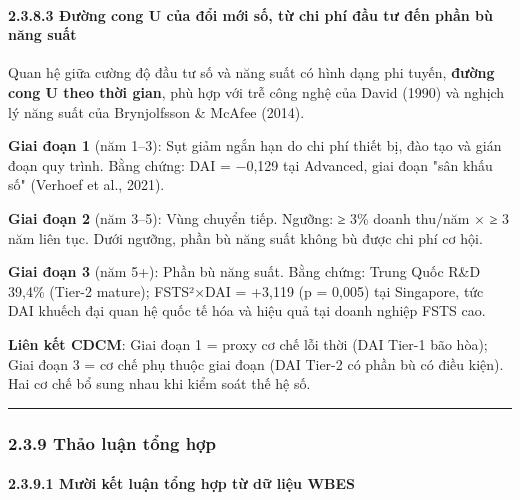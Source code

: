 \documentclass[12pt,a4paper]{article}
\begin{document}
\hypertarget{2383-ux111ux1b0ux1eddng-cong-u-cux1ee7a-ux111ux1ed5i-mux1edbi-sux1ed1-tux1eeb-chi-phuxed-ux111ux1ea7u-tux1b0-ux111ux1ebfn-phux1ea7n-buxf9-nux103ng-suux1ea5t}{%
\paragraph{2.3.8.3 Đường cong U của đổi mới số, từ chi phí đầu tư đến
phần bù năng
suất}\label{2383-ux111ux1b0ux1eddng-cong-u-cux1ee7a-ux111ux1ed5i-mux1edbi-sux1ed1-tux1eeb-chi-phuxed-ux111ux1ea7u-tux1b0-ux111ux1ebfn-phux1ea7n-buxf9-nux103ng-suux1ea5t}}

Quan hệ giữa cường độ đầu tư số và năng suất có hình dạng phi tuyến,
\textbf{đường cong U theo thời gian}, phù hợp với trễ công nghệ của
David (1990) và nghịch lý năng suất của Brynjolfsson \& McAfee (2014).

\textbf{Giai đoạn 1} (năm 1--3): Sụt giảm ngắn hạn do chi phí thiết bị,
đào tạo và gián đoạn quy trình. Bằng chứng: DAI = −0,129 tại Advanced,
giai đoạn "sân khấu số" (Verhoef et al., 2021).

\textbf{Giai đoạn 2} (năm 3--5): Vùng chuyển tiếp. Ngưỡng: ≥ 3\% doanh
thu/năm × ≥ 3 năm liên tục. Dưới ngưỡng, phần bù năng suất không bù được
chi phí cơ hội.

\textbf{Giai đoạn 3} (năm 5+): Phần bù năng suất. Bằng chứng: Trung Quốc
R\&D 39,4\% (Tier-2 mature); FSTS²×DAI = +3,119 (p = 0,005) tại
Singapore, tức DAI khuếch đại quan hệ quốc tế hóa và hiệu quả tại doanh
nghiệp FSTS cao.

\textbf{Liên kết CDCM}: Giai đoạn 1 = proxy cơ chế lỗi thời (DAI Tier-1
bão hòa); Giai đoạn 3 = cơ chế phụ thuộc giai đoạn (DAI Tier-2 có phần
bù có điều kiện). Hai cơ chế bổ sung nhau khi kiểm soát thế hệ số.

\begin{center}\rule{0.5\linewidth}{0.5pt}\end{center}

\hypertarget{239-thux1ea3o-luux1eadn-tux1ed5ng-hux1ee3p}{%
\subsubsection{2.3.9 Thảo luận tổng
hợp}\label{239-thux1ea3o-luux1eadn-tux1ed5ng-hux1ee3p}}

\hypertarget{2391-mux1b0ux1eddi-kux1ebft-luux1eadn-tux1ed5ng-hux1ee3p-tux1eeb-dux1eef-liux1ec7u-wbes}{%
\paragraph{2.3.9.1 Mười kết luận tổng hợp từ dữ liệu
WBES}\label{2391-mux1b0ux1eddi-kux1ebft-luux1eadn-tux1ed5ng-hux1ee3p-tux1eeb-dux1eef-liux1ec7u-wbes}}
\end{document}
